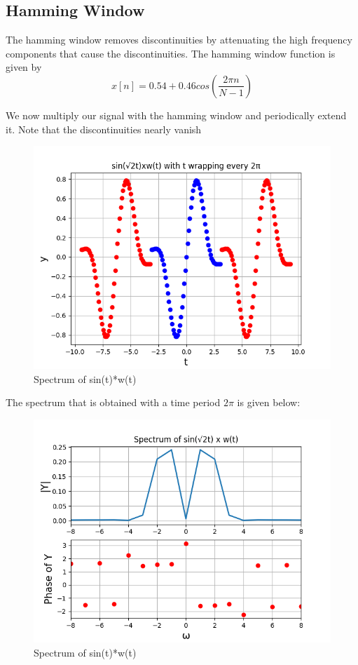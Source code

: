 \documentclass{article}
\begin{document}
\subsection{Hamming Window}
The hamming window removes discontinuities by attenuating the high frequency components that cause the discontinuities.
The hamming window function is given by
\begin{equation}
    x[n] = 0.54 + 0.46cos(\frac{2\pi n}{N-1})
\end{equation}

We now multiply our signal with the hamming window and periodically extend it. Note that the discontinuities nearly vanish
\begin{figure}[h!]
\centering
\includegraphics[scale=0.6]{fig10-5.png}
\caption{Spectrum of sin(t)*w(t)}
\label{fig:universe}
\end{figure}
\clearpage

The spectrum that is obtained with a time period $2\pi$ is given below:
\begin{figure}[h!]
\centering
\includegraphics[scale=0.6]{fig10-6.png}
\caption{Spectrum of sin(t)*w(t)}
\label{fig:universe}
\end{figure}
\end{document}
